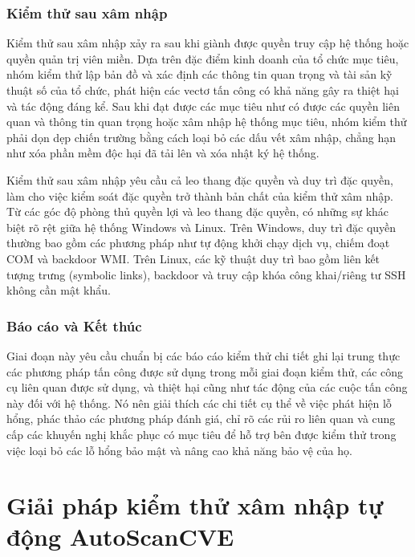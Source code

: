 \documentclass[conference]{IEEEtran}
\begin{document}
\subsubsection{Kiểm thử sau xâm nhập}
Kiểm thử sau xâm nhập xảy ra sau khi giành được quyền truy cập hệ thống hoặc quyền quản trị viên miền. Dựa trên đặc điểm kinh doanh của tổ chức mục tiêu, nhóm kiểm thử lập bản đồ và xác định các thông tin quan trọng và tài sản kỹ thuật số của tổ chức, phát hiện các vectơ tấn công có khả năng gây ra thiệt hại và tác động đáng kể. Sau khi đạt được các mục tiêu như có được các quyền liên quan và thông tin quan trọng hoặc xâm nhập hệ thống mục tiêu, nhóm kiểm thử phải dọn dẹp chiến trường bằng cách loại bỏ các dấu vết xâm nhập, chẳng hạn như xóa phần mềm độc hại đã tải lên và xóa nhật ký hệ thống.

Kiểm thử sau xâm nhập yêu cầu cả leo thang đặc quyền và duy trì đặc quyền, làm cho việc kiểm soát đặc quyền trở thành bản chất của kiểm thử xâm nhập. Từ các góc độ phòng thủ quyền lợi và leo thang đặc quyền, có những sự khác biệt rõ rệt giữa hệ thống Windows và Linux. Trên Windows, duy trì đặc quyền thường bao gồm các phương pháp như tự động khởi chạy dịch vụ, chiếm đoạt COM và backdoor WMI. Trên Linux, các kỹ thuật duy trì bao gồm liên kết tượng trưng (symbolic links), backdoor và truy cập khóa công khai/riêng tư SSH không cần mật khẩu.

\subsubsection{Báo cáo và Kết thúc}
Giai đoạn này yêu cầu chuẩn bị các báo cáo kiểm thử chi tiết ghi lại trung thực các phương pháp tấn công được sử dụng trong mỗi giai đoạn kiểm thử, các công cụ liên quan được sử dụng, và thiệt hại cũng như tác động của các cuộc tấn công này đối với hệ thống. Nó nên giải thích các chi tiết cụ thể về việc phát hiện lỗ hổng, phác thảo các phương pháp đánh giá, chỉ rõ các rủi ro liên quan và cung cấp các khuyến nghị khắc phục có mục tiêu để hỗ trợ bên được kiểm thử trong việc loại bỏ các lỗ hổng bảo mật và nâng cao khả năng bảo vệ của họ.

\section{Giải pháp kiểm thử xâm nhập tự động AutoScanCVE}
\end{document}

